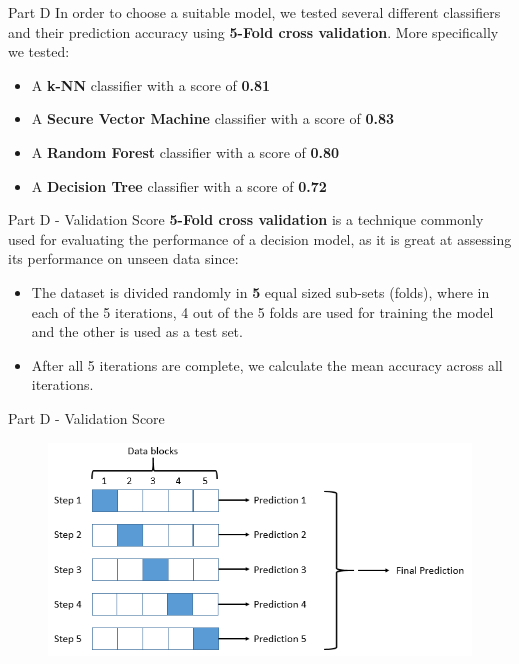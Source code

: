 \documentclass{beamer}
\begin{document}
    \begin{frame}{Part D}
    In order to choose a suitable model, we tested several different classifiers and their prediction accuracy 
    using \textbf{5-Fold cross validation}. More specifically we tested:
    \begin{itemize}
        \item A \textbf{k-NN} classifier with a score of \textbf{0.81}
        \item A \textbf{Secure Vector Machine} classifier with a score of \textbf{0.83}
        \item A \textbf{Random Forest} classifier with a score of \textbf{0.80}
        \item A \textbf{Decision Tree} classifier with a score of \textbf{0.72}
    \end{itemize}
    \end{frame}

    \begin{frame}{Part D - Validation Score}
    \textbf{5-Fold cross validation} is a technique commonly used for evaluating the performance of a decision model,
    as it is great at assessing its performance on unseen data since:
    \begin{itemize}
        \item The dataset is divided randomly in \textbf{5} equal sized sub-sets (folds), where in each of the 5 iterations,
        4 out of the 5 folds are used for training the model and the other is used as a test set.
        \item After all 5 iterations are complete, we calculate the mean accuracy across all iterations.
    \end{itemize}
    \end{frame}

    \begin{frame}{Part D - Validation Score}
    \begin{figure}
        \centering
        \includegraphics[width=0.75\linewidth]{D1.png}
        \label{Graph A2}
    \end{figure}
    \end{frame}
\end{document}
